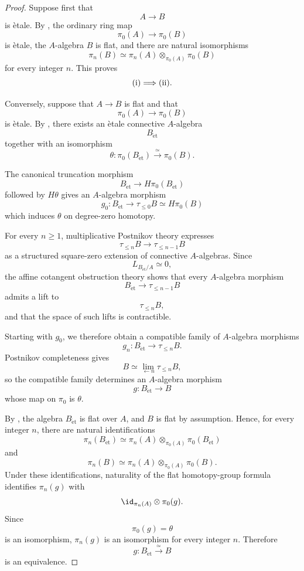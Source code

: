 \begin{proof}
Suppose first that
\[
    A
    \longrightarrow
    B
\]
is \`etale. By
,
the ordinary ring map
\[
    \pi_0(A)
    \longrightarrow
    \pi_0(B)
\]
is \`etale, the \(A\)-algebra \(B\) is flat, and there are natural
isomorphisms
\[
    \pi_n(B)
    \simeq
    \pi_n(A)
    \otimes_{\pi_0(A)}
    \pi_0(B)
\]
for every integer \(n\). This proves
\[
    \textup{(i)}
    \Longrightarrow
    \textup{(ii)}.
\]

Conversely, suppose that \(A\to B\) is flat and that
\[
    \pi_0(A)
    \longrightarrow
    \pi_0(B)
\]
is \`etale. By
,
there exists an \`etale connective \(A\)-algebra
\[
    B_{\mathrm{\acute et}}
\]
together with an isomorphism
\[
    \theta
    \colon
    \pi_0(B_{\mathrm{\acute et}})
    \xrightarrow{\simeq}
    \pi_0(B).
\]

The canonical truncation morphism
\[
    B_{\mathrm{\acute et}}
    \longrightarrow
    H\pi_0(B_{\mathrm{\acute et}})
\]
followed by \(H\theta\) gives an \(A\)-algebra morphism
\[
    g_0
    \colon
    B_{\mathrm{\acute et}}
    \longrightarrow
    \tau_{\leq0}B
    \simeq
    H\pi_0(B)
\]
which induces \(\theta\) on degree-zero homotopy.

For every \(n\geq1\), multiplicative Postnikov theory expresses
\[
    \tau_{\leq n}B
    \longrightarrow
    \tau_{\leq n-1}B
\]
as a structured square-zero extension of connective \(A\)-algebras.
Since
\[
    L_{B_{\mathrm{\acute et}}/A}
    \simeq
    0,
\]
the affine cotangent obstruction theory shows that every \(A\)-algebra
morphism
\[
    B_{\mathrm{\acute et}}
    \longrightarrow
    \tau_{\leq n-1}B
\]
admits a lift to
\[
    \tau_{\leq n}B,
\]
and that the space of such lifts is contractible.

Starting with \(g_0\), we therefore obtain a compatible family of
\(A\)-algebra morphisms
\[
    g_n
    \colon
    B_{\mathrm{\acute et}}
    \longrightarrow
    \tau_{\leq n}B.
\]
Postnikov completeness gives
\[
    B
    \simeq
    \lim_{\longleftarrow n}
    \tau_{\leq n}B,
\]
so the compatible family determines an \(A\)-algebra morphism
\[
    g
    \colon
    B_{\mathrm{\acute et}}
    \longrightarrow
    B
\]
whose map on \(\pi_0\) is \(\theta\).

By
,
the algebra \(B_{\mathrm{\acute et}}\) is flat over \(A\), and \(B\) is
flat by assumption. Hence, for every integer \(n\), there are natural
identifications
\[
    \pi_n(B_{\mathrm{\acute et}})
    \simeq
    \pi_n(A)
    \otimes_{\pi_0(A)}
    \pi_0(B_{\mathrm{\acute et}})
\]
and
\[
    \pi_n(B)
    \simeq
    \pi_n(A)
    \otimes_{\pi_0(A)}
    \pi_0(B).
\]
Under these identifications, naturality of the flat homotopy-group
formula identifies \(\pi_n(g)\) with
\[
    \id_{\pi_n(A)}
    \otimes
    \pi_0(g).
\]
Since
\[
    \pi_0(g)
    =
    \theta
\]
is an isomorphism, \(\pi_n(g)\) is an isomorphism for every integer
\(n\). Therefore
\[
    g
    \colon
    B_{\mathrm{\acute et}}
    \xrightarrow{\simeq}
    B
\]
is an equivalence.


\end{proof}

